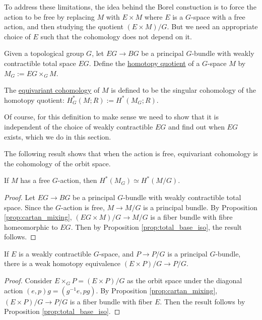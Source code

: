 To address these limitations, the idea behind the Borel constuction is to force 
the action to be free by replacing  $M$ with  $E\times M$ where $E$ is a  
$G$-space with a free action, and then studying the quotient  $(E\times M) /G$. 
But we need an appropriate choice of $E$ such that the cohomology does not 
depend on it.

\begin{defn}
	Given a topological group $G$, let  $EG \to BG$ be a principal  $G$-bundle
	with weakly contractible total space  $EG$. Define the  \underline{homotopy
	quotient} of a $G$-space $M$ by $M_G:=EG\times_G M$.
	 
	The \underline{equivariant cohomology} of $M$ is defined to be the singular
	cohomology of the homotopy quotient: $H_G^*(M;R) := H^*(M_G;R)$.
\end{defn}
Of course, for this definition to make sense we need to show that it is
independent of the choice of weakly contractible $EG$ and find out when $EG$ 
exists, which we do in this section. 

The following result shows that when the action is free, equivariant cohomology
is the cohomology of the orbit space.
\begin{prop} \label{prop:free_action_cohomology}
	If $M$ has a free  $G$-action, then $H^*(M_G)\simeq H^*(M /G)$. 
\end{prop}
\begin{proof}
	Let $EG \to BG$ be a principal  $G$-bundle with weakly contractible total
	space. Since the $G$-action is free,  $M \to M /G$ is a principal bundle.
	By Proposition \ref{prop:cartan_mixing}, 
	$(EG\times M) /G \to M /G$ is a fiber bundle with
	fibre homeomorphic to $EG$. Then by Proposition \ref{prop:total_base_iso},
	the result follows.
\end{proof}

\begin{lem} %
	If $E$ is a weakly contractible $G$-space, and $P\to P/G$ is a principal
	$G$-bundle, there is a weak homotopy equivalence $(E\times P) /G \to P /G$.  
\end{lem}
\begin{proof}
	Consider $E\times_G P = (E\times P) /G$ as the orbit space under 
	the diagonal action $(e,p)g = (g^{-1}e,pg)$. 
	By Proposition \ref{prop:cartan_mixing}, $(E\times P) /G \to P /G$ is a
	fiber bundle with fiber $E$. Then the result follows by Proposition
	\ref{prop:total_base_iso}.
\end{proof}

